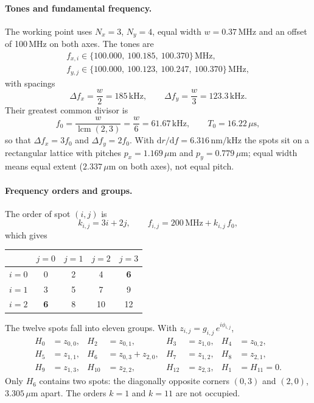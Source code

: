 \paragraph{Tones and fundamental frequency.}
The working point uses $N_x=3$, $N_y=4$, equal width $w=0.37$\,MHz and an
offset of 100\,MHz on both axes. The tones are
\begin{gather}
f_{x,i}\in\{100.000,\ 100.185,\ 100.370\}\,\mathrm{MHz},\\
f_{y,j}\in\{100.000,\ 100.123,\ 100.247,\ 100.370\}\,\mathrm{MHz},
\end{gather}
with spacings
\begin{equation}
\Delta f_x=\frac{w}{2}=185\,\mathrm{kHz},
\qquad
\Delta f_y=\frac{w}{3}=123.3\,\mathrm{kHz}.
\end{equation}
Their greatest common divisor is
\begin{equation}
f_0=\frac{w}{\operatorname{lcm}(2,3)}=\frac{w}{6}=61.67\,\mathrm{kHz},
\qquad
T_0=16.22\,\mu\mathrm{s},
\end{equation}
so that $\Delta f_x=3f_0$ and $\Delta f_y=2f_0$. With
$\mathrm{d}r/\mathrm{d}f=6.316\,\mathrm{nm/kHz}$ the spots sit on a
rectangular lattice with pitches $p_x=1.169\,\mu$m and $p_y=0.779\,\mu$m;
equal width means equal extent ($2.337\,\mu$m on both axes), not equal pitch.

\paragraph{Frequency orders and groups.}
The order of spot $(i,j)$ is
\begin{equation}
k_{i,j}=3i+2j,
\qquad
f_{i,j}=200\,\mathrm{MHz}+k_{i,j}\,f_0 ,
\end{equation}
which gives
\begin{center}
\begin{tabular}{c|cccc}
 & $j=0$ & $j=1$ & $j=2$ & $j=3$\\ \hline
$i=0$ & 0 & 2 & 4 & \textbf{6}\\
$i=1$ & 3 & 5 & 7 & 9\\
$i=2$ & \textbf{6} & 8 & 10 & 12
\end{tabular}
\end{center}
The twelve spots fall into eleven groups. With $z_{i,j}=g_{i,j}\,e^{i\phi_{i,j}}$,
\begin{equation}
\begin{aligned}
H_0&=z_{0,0}, & H_2&=z_{0,1}, & H_3&=z_{1,0}, & H_4&=z_{0,2},\\
H_5&=z_{1,1}, & H_6&=z_{0,3}+z_{2,0}, & H_7&=z_{1,2}, & H_8&=z_{2,1},\\
H_9&=z_{1,3}, & H_{10}&=z_{2,2}, & H_{12}&=z_{2,3}, & H_1&=H_{11}=0.
\end{aligned}
\end{equation}
Only $H_6$ contains two spots: the diagonally opposite corners $(0,3)$ and
$(2,0)$, $3.305\,\mu$m apart. The orders $k=1$ and $k=11$ are not occupied.

